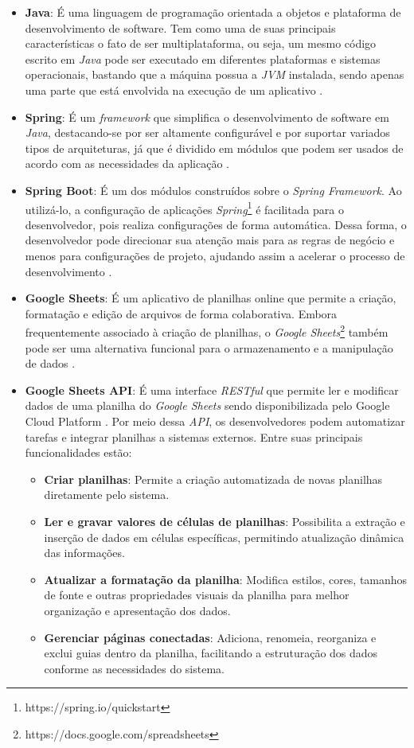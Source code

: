 \begin{itemize}
    \item \textbf{Java}: É uma linguagem de programação orientada a objetos e plataforma de desenvolvimento de software. Tem como uma de suas principais características o fato de ser multiplataforma, ou seja, um mesmo código escrito em \textit{Java} pode ser executado em diferentes plataformas e sistemas operacionais, bastando que a máquina possua a \textit{JVM} instalada, sendo apenas uma parte que está envolvida na execução de um aplicativo \cite{Java2025}.
    \item \textbf{Spring}: É um \textit{framework} que simplifica o desenvolvimento de software em \textit{Java}, destacando-se por ser altamente configurável e por suportar variados tipos de arquiteturas, já que é dividido em módulos que podem ser usados de acordo com as necessidades da aplicação \cite{Spring2025}.
    \item \textbf{Spring Boot}: É um dos módulos construídos sobre o \textit{Spring Framework}. Ao utilizá-lo, a configuração de aplicações \textit{Spring}\footnote{https://spring.io/quickstart} é facilitada para o desenvolvedor, pois realiza configurações de forma automática. Dessa forma, o desenvolvedor pode direcionar sua atenção mais para as regras de negócio e menos para configurações de projeto, ajudando assim a acelerar o processo de desenvolvimento \cite{SpringBoot2025}.
    \item \textbf{Google Sheets}: É um aplicativo de planilhas online que permite a criação, formatação e edição de arquivos de forma colaborativa. Embora frequentemente associado à criação de planilhas, o \textit{Google Sheets}\footnote{https://docs.google.com/spreadsheets} também pode ser uma alternativa funcional para o armazenamento e a manipulação de dados \cite{ufsm2024}.
    \item \textbf{Google Sheets API}: É uma interface \textit{RESTful} que permite ler e modificar dados de uma planilha do \textit{Google Sheets} sendo disponibilizada pelo Google Cloud Platform \cite{apisheets2025}. Por meio dessa \textit{API}, os desenvolvedores podem automatizar tarefas e integrar planilhas a sistemas externos. Entre suas principais funcionalidades estão:

    \begin{itemize}
        \item \textbf{Criar planilhas}: Permite a criação automatizada de novas planilhas diretamente pelo sistema.
        \item \textbf{Ler e gravar valores de células de planilhas}: Possibilita a extração e inserção de dados em células específicas, permitindo atualização dinâmica das informações.
        \item \textbf{Atualizar a formatação da planilha}: Modifica estilos, cores, tamanhos de fonte e outras propriedades visuais da planilha para melhor organização e apresentação dos dados.
        \item \textbf{Gerenciar páginas conectadas}: Adiciona, renomeia, reorganiza e exclui guias dentro da planilha, facilitando a estruturação dos dados conforme as necessidades do sistema.
    \end{itemize}


\end{itemize}
